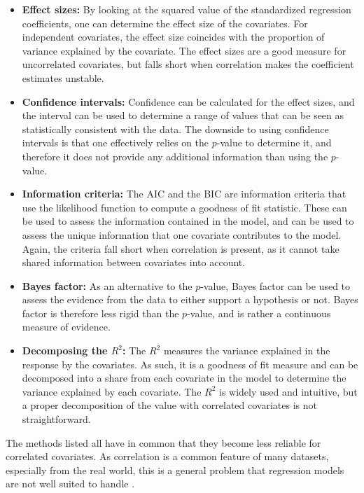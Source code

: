 \begin{itemize}
    \item \textbf{Effect sizes:} By looking at the squared value of the standardized regression coefficients, one can determine the effect size of the covariates. For independent covariates, the effect size coincides with the proportion of variance explained by the covariate. The effect sizes are a good measure for uncorrelated covariates, but falls short when correlation makes the coefficient estimates unstable.
    \item \textbf{Confidence intervals:} Confidence can be calculated for the effect sizes, and the interval can be used to determine a range of values that can be seen as statistically consistent with the data. The downside to using confidence intervals is that one effectively relies on the $p$-value to determine it, and therefore it does not provide any additional information than using the $p$-value.
    \item \textbf{Information criteria:} The AIC \citep{Akaike_AIC} and the BIC \citep{Schwarz_BIC} are information criteria that use the likelihood function to compute a goodness of fit statistic. These can be used to assess the information contained in the model, and can be used to assess the unique information that one covariate contributes to the model. Again, the criteria fall short when correlation is present, as it cannot take shared information between covariates into account. 
    \item \textbf{Bayes factor:} As an alternative to the $p$-value, Bayes factor can be used to assess the evidence from the data to either support a hypothesis or not. Bayes factor is therefore less rigid than the $p$-value, and is rather a continuous measure of evidence.
    \item \textbf{Decomposing the $R^2$:} The $R^2$ measures the variance explained in the response by the covariates. As such, it is a goodness of fit measure and can be decomposed into a share from each covariate in the model to determine the variance explained by each covariate. The $R^2$ is widely used and intuitive, but a proper decomposition of the value with correlated covariates is not straightforward.
\end{itemize}
The methods listed all have in common that they become less reliable for correlated covariates. As correlation is a common feature of many datasets, especially from the real world, this is a general problem that regression models are not well suited to handle \citep{Gromping_2015}. 
\\
